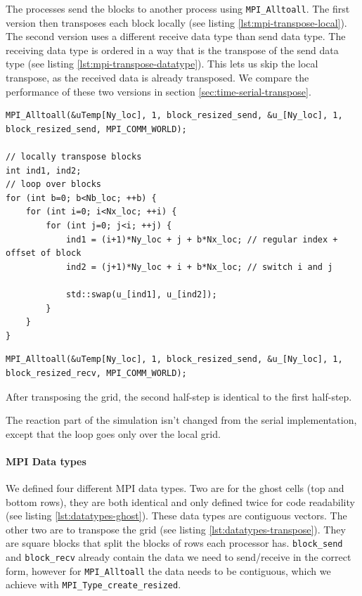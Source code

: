 \documentclass[a4paper]{article}
\begin{document}
The processes send the blocks to another process using \verb+MPI_Alltoall+.
The first version then transposes each block locally (see listing \ref{lst:mpi-transpose-local}).
The second version uses a different receive data type than send data type.
The receiving data type is ordered in a way that is the transpose of the send data type (see listing \ref{lst:mpi-transpose-datatype}).
This lets us skip the local transpose, as the received data is already transposed.
We compare the performance of these two versions in section \ref{sec:time-serial-transpose}.

\begin{lstlisting}[label={lst:mpi-transpose-local}, caption={Transposing the grid using MPI Alltoall and local transpose}, float]
MPI_Alltoall(&uTemp[Ny_loc], 1, block_resized_send, &u_[Ny_loc], 1, block_resized_send, MPI_COMM_WORLD);
        
// locally transpose blocks
int ind1, ind2;
// loop over blocks
for (int b=0; b<Nb_loc; ++b) {
    for (int i=0; i<Nx_loc; ++i) {
        for (int j=0; j<i; ++j) {
            ind1 = (i+1)*Ny_loc + j + b*Nx_loc; // regular index + offset of block
            ind2 = (j+1)*Ny_loc + i + b*Nx_loc; // switch i and j
                    
            std::swap(u_[ind1], u_[ind2]);
        }
    }
}
\end{lstlisting}
\begin{lstlisting}[label={lst:mpi-transpose-datatype}, caption={Transposing the grid using MPI Alltoall and different send/receive datatypes}, float]
MPI_Alltoall(&uTemp[Ny_loc], 1, block_resized_send, &u_[Ny_loc], 1, block_resized_recv, MPI_COMM_WORLD);
\end{lstlisting}

After transposing the grid, the second half-step is identical to the first half-step.

The reaction part of the simulation isn't changed from the serial implementation, except that the loop goes only over the local grid.

\paragraph{MPI Data types}
We defined four different MPI data types.
Two are for the ghost cells (top and bottom rows), they are both identical and only defined twice for code readability (see listing \ref{lst:datatypes-ghost}).
These data types are contiguous vectors.
The other two are to transpose the grid (see listing \ref{lst:datatypes-transpose}).
They are square blocks that split the blocks of rows each processor has.
\verb+block_send+ and \verb+block_recv+ already contain the data we need to send/receive in the correct form, however for \verb+MPI_Alltoall+ the data needs to be contiguous, which we achieve with \verb+MPI_Type_create_resized+.
\end{document}
